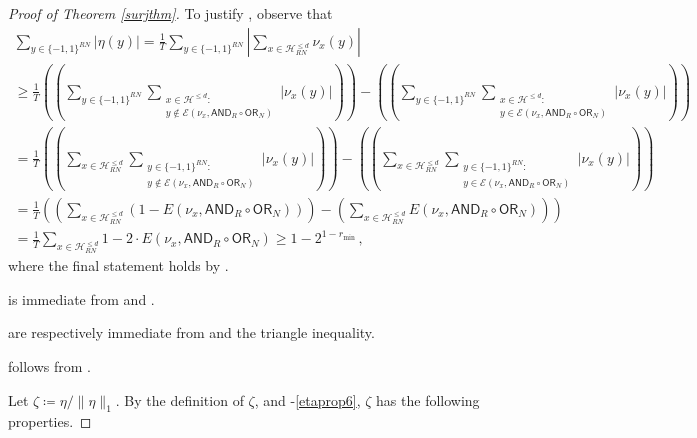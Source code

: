 \documentclass{toc}
\newcommand{\OR}{\mathsf{ OR}}
\newcommand{\bits}{\{-1,1\}}
\newcommand{\Hcal}{\mathcal{H}}
\newcommand{\AND}{\mathsf{AND}}
\begin{document}
\begin{proof}[Proof of Theorem \ref{surjthm}]
	To justify , observe that 
	\begin{align*}
	\sum_{y \in \bits^{RN}} |\eta(y)| = \frac1T \sum_{y \in \bits^{RN}} \left|\sum_{x \in \Hcal^{\leq d}_{RN}}  \nu_x(y)\right| \\
	\geq \frac1T \left( \left(\sum_{y \in \bits^{RN}} \sum_{\substack{x \in \Hcal^{\leq d} \colon\\ y \not \in \mathcal{E}(\nu_x, \AND_R \circ \OR_N)}} \left|\nu_x(y)\right|\right)\right)
	-  \left( \left(\sum_{y \in \bits^{RN}} \sum_{\substack{x \in \Hcal^{\leq d} \colon\\ y \in \mathcal{E}(\nu_x, \AND_R \circ \OR_N)}}  |\nu_x(y)|\right)\right)\\
	= \frac1T \left( \left(\sum_{x \in \Hcal^{\leq d}_{RN}} \sum_{\substack{y \in \bits^{RN} \colon \\ y \not \in \mathcal{E}(\nu_x, \AND_R \circ \OR_N)}} \left|\nu_x(y)\right|\right)\right)
	-  \left( \left(\sum_{x \in \Hcal^{\leq d}_{RN}}  \sum_{\substack{y \in \bits^{RN} \colon\\ y \in \mathcal{E}(\nu_x, \AND_R \circ \OR_N)}} \left|\nu_x(y)\right|\right)\right)\\
	= \frac1T \left( \left(\sum_{x \in \Hcal^{\leq d}_{RN}} \left(1-E\left(\nu_x, \AND_R \circ \OR_N\right)\right)\right) - \left( \sum_{x \in \Hcal^{\leq d}_{RN}} E\left(\nu_x, \AND_R \circ \OR_N\right)\right)\right)\\
	=  \frac1T \sum_{x \in \Hcal^{\leq d}_{RN}} 1-2 \cdot E\left(\nu_x, \AND_R \circ \OR_N\right) \geq 1-2^{1-r_{\text{min}}}\,,
	\end{align*}
where the final statement holds by .
	
	 is immediate from  and .
	
	  are respectively immediate from   and the triangle inequality.
	
	 follows from  .
	
	\medskip
	Let $\zeta \coloneqq  \eta/\|\eta\|_1$. By the definition of $\zeta$, and -\eqref{etaprop6}, $\zeta$ has the following properties. %
	

\end{proof}
\end{document}
